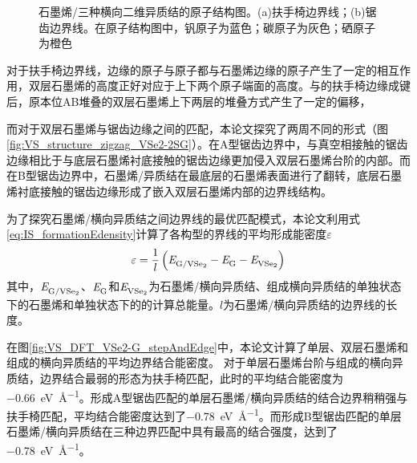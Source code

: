 \begin{figure}[htb]
{            \label{fig:VS_structure_zigzag_VSe2-2SG}
        }
        \caption{石墨烯/三种横向二维异质结的原子结构图。(a)扶手椅边界线；(b)锯齿边界线。在原子结构图中，钒原子为蓝色；碳原子为灰色；硒原子为橙色}
        \label{fig:VS_structure_ac_zz}
    \end{figure}
    
    对于扶手椅边界线，边缘的原子与原子都与石墨烯边缘的原子产生了一定的相互作用，双层石墨烯的高度正好对应于上下两个原子端面的高度。与的扶手椅边缘成键后，原本位AB堆叠的双层石墨烯上下两层的堆叠方式产生了一定的偏移，

    而对于双层石墨烯与锯齿边缘之间的匹配，本论文探究了两周不同的形式（图\ref{fig:VS_structure_zigzag_VSe2-2SG}）。在A型锯齿边界中，与真空相接触的锯齿边缘相比于与底层石墨烯衬底接触的锯齿边缘更加侵入双层石墨烯台阶的内部。而在B型锯齿边界中，石墨烯/异质结在最底层的石墨烯表面进行了翻转，底层石墨烯衬底接触的锯齿边缘形成了嵌入双层石墨烯内部的边界线结构。

    为了探究石墨烯/横向异质结之间边界线的最优匹配模式，本论文利用式\eqref{eq:IS_formationEdensity}计算了各构型的界线的平均形成能密度$\varepsilon$\chinesecolon
    \begin{equation}
        \label{eq:IS_formationEdensity}
        \varepsilon = \frac{1}{l} \left( \energyVar{G/\ce{VSe2}}{} -\energyVar{G}{} -\energyVar{\ce{VSe2}}{} \right)
    \end{equation}
    其中，$\energyVar{G/\ce{VSe2}}{}$、$\it E_{\rm G}^{\rm } \it$和$\energyVar{\ce{VSe2}}{}$为石墨烯/横向异质结、组成横向异质结的单独状态下的石墨烯和单独状态下的的计算总能量。$l$为石墨烯/横向异质结的边界线的长度。
    
    在图\ref{fig:VS_DFT_VSe2-G_stepAndEdge}中，本论文计算了单层、双层石墨烯和组成的横向异质结的平均边界结合能密度。
    对于单层石墨烯台阶与组成的横向异质结，边界结合最弱的形态为扶手椅匹配，此时的平均结合能密度为\SI{-0.66}{\electronvolt\per\angstrom}。形成A型锯齿匹配的单层石墨烯/横向异质结的结合边界稍稍强与扶手椅匹配，平均结合能密度达到了\SI{-0.78}{\electronvolt\per\angstrom}。而形成B型锯齿匹配的单层石墨烯/横向异质结在三种边界匹配中具有最高的结合强度，达到了\SI{-0.78}{\electronvolt\per\angstrom}。

